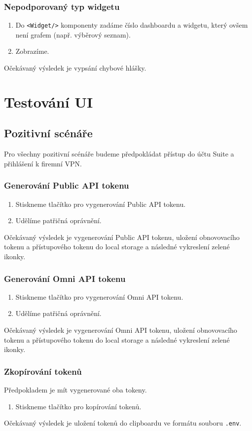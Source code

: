 \documentclass[czech, bc, kiv, he, iso690numb]{fasthesis}
\begin{document}
\subsubsection{Nepodporovaný typ widgetu}
\begin{enumerate}
	\item Do \texttt{<Widget/>} komponenty zadáme číslo dashboardu a widgetu, který ovšem není grafem (např. výběrový seznam).
	\item Zobrazíme.
\end{enumerate}
Očekávaný výsledek je vypsání chybové hlášky.

\section{Testování UI}
\subsection{Pozitivní scénáře}
Pro všechny pozitivní scénáře budeme předpokládat přístup do účtu Suite a přihlášení k firemní VPN.
\subsubsection{Generování Public API tokenu}
\begin{enumerate}
	\item Stiskneme tlačítko pro vygenerování Public API tokenu.
	\item Udělíme patřičná oprávnění.
\end{enumerate}
Očekávaný výsledek je vygenerování Public API tokenu, uložení obnovovacího tokenu a přístupového tokenu do local storage a následné vykreslení zelené ikonky.

\subsubsection{Generování Omni API tokenu}
\begin{enumerate}
	\item Stiskneme tlačítko pro vygenerování Omni API tokenu.
	\item Udělíme patřičná oprávnění.
\end{enumerate}
Očekávaný výsledek je vygenerování Omni API tokenu, uložení obnovovacího tokenu a přístupového tokenu do local storage a následné vykreslení zelené ikonky.

\subsubsection{Zkopírování tokenů}
Předpokladem je mít vygenerované oba tokeny.
\begin{enumerate}
	\item Stiskneme tlačítko pro kopírování tokenů.
\end{enumerate}
Očekávaný výsledek je uložení tokenů do clipboardu ve formátu souboru \texttt{.env}.
\end{document}
